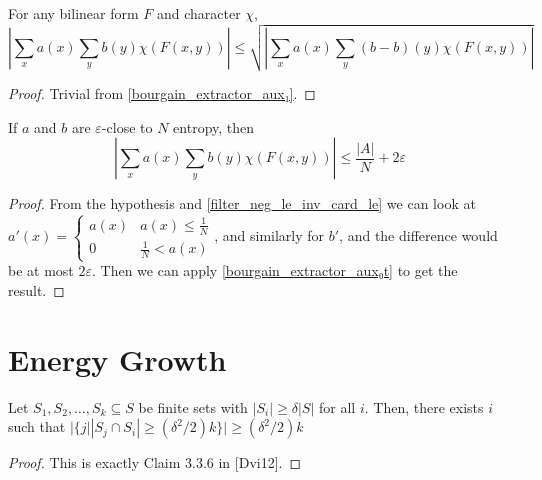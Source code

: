 \begin{theorem}
    \label{bourgain_extractor_aux₁t}
    \leanok
    For any bilinear form $F$ and character $\chi$,
    $$|\sum_x{a(x) \sum_y{b(y) \chi(F(x, y))}}| \leq \sqrt{|\sum_x{a(x) \sum_y{(b-b)(y) \chi(F(x, y))}}|}$$
\end{theorem}

\begin{proof}
    \leanok
    Trivial from \ref{bourgain_extractor_aux₁}.
\end{proof}

\begin{theorem}
    \label{bourgain_extractor_aux₂}
    \leanok
    If $a$ and $b$ are $\varepsilon$-close to $N$ entropy,
    then 
    $$|\sum_x{a(x) \sum_y{b(y) \chi(F(x, y))}}| \leq \frac{|A|}N + 2\varepsilon$$
\end{theorem}

\begin{proof}
    \leanok
    From the hypothesis and \ref{filter_neg_le_inv_card_le} we can look at $a'(x) = \begin{cases}a(x) & a(x) \leq \frac1N \\ 0 & \frac1N < a(x)\end{cases}$, and similarly
    for $b'$, and the difference would be at most $2 \varepsilon$. Then we can apply \ref{bourgain_extractor_aux₀t} to get the result.
\end{proof}



\chapter{Energy Growth}
\label{chap:egrowth}

\begin{theorem}
    \label{claim336}
    \leanok

    Let $S_1, S_2, \dots, S_k \subseteq S$ be finite sets with $|S_i| \geq \delta |S|$ for all $i$.
    Then, there exists $i$ such that $|\{j | |S_j \cap S_i| \geq (\delta^2 / 2) k\}| \geq (\delta^2 / 2) k$
\end{theorem}

\begin{proof}
    \leanok
    This is exactly Claim 3.3.6 in [Dvi12].
\end{proof}

